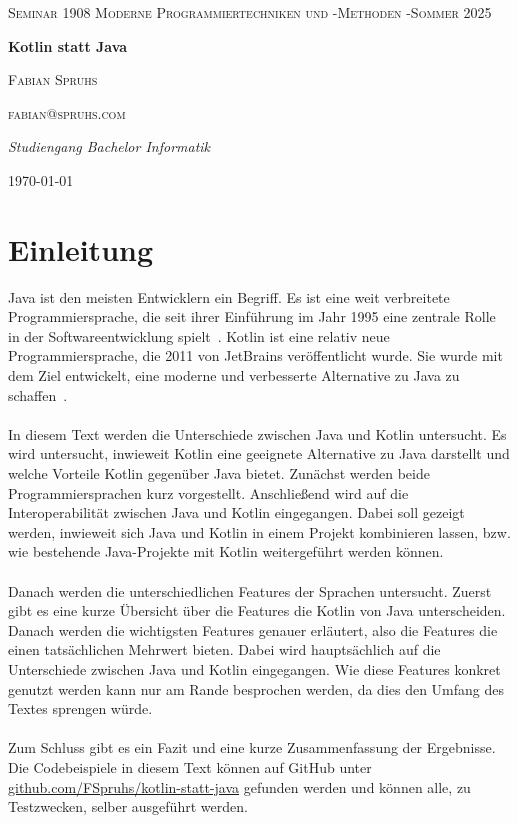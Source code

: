 \documentclass[11pt]{article}
\begin{document}
    \begin{titlepage}
        \centering
        {\scshape\LARGE Seminar 1908 Moderne Programmiertechniken und -Methoden -Sommer 2025 \par}
        \vspace{1cm}
        {\huge\bfseries Kotlin statt Java\par}
        \vspace{1.5cm}
        {\scshape\Large Fabian Spruhs\par}
        {\scshape fabian@spruhs.com\par}
        \vspace{2cm}
        {\Large\itshape Studiengang Bachelor Informatik\par}
        \vspace{2cm}


        {\large \today\par}
    \end{titlepage}

    \tableofcontents
    \newpage

    \section{Einleitung}
    Java ist den meisten Entwicklern ein Begriff.
    Es ist eine weit verbreitete Programmiersprache, die seit ihrer Einführung im Jahr 1995 eine zentrale Rolle in der Softwareentwicklung spielt~\cite[54]{insel}.
    Kotlin ist eine relativ neue Programmiersprache, die 2011 von JetBrains veröffentlicht wurde.
    Sie wurde mit dem Ziel entwickelt, eine moderne und verbesserte Alternative zu Java zu schaffen~\cite[19]{kotlin-handbuch}.\\
    \\
    In diesem Text werden die Unterschiede zwischen Java und Kotlin untersucht.
    Es wird untersucht, inwieweit Kotlin eine geeignete Alternative zu Java darstellt und welche Vorteile Kotlin gegenüber Java bietet.
    Zunächst werden beide Programmiersprachen kurz vorgestellt.
    Anschließend wird auf die Interoperabilität zwischen Java und Kotlin eingegangen.
    Dabei soll gezeigt werden, inwieweit sich Java und Kotlin in einem Projekt kombinieren lassen, bzw. wie bestehende Java-Projekte mit Kotlin weitergeführt werden können.\\
    \\
    Danach werden die unterschiedlichen Features der Sprachen untersucht.
    Zuerst gibt es eine kurze Übersicht über die Features die Kotlin von Java unterscheiden.
    Danach werden die wichtigsten Features genauer erläutert, also die Features die einen tatsächlichen Mehrwert bieten.
    Dabei wird hauptsächlich auf die Unterschiede zwischen Java und Kotlin eingegangen.
    Wie diese Features konkret genutzt werden kann nur am Rande besprochen werden, da dies den Umfang des Textes sprengen würde.\\
    \\
    Zum Schluss gibt es ein Fazit und eine kurze Zusammenfassung der Ergebnisse.
    Die Codebeispiele in diesem Text können auf GitHub unter \url{github.com/FSpruhs/kotlin-statt-java} gefunden werden und können alle, zu Testzwecken, selber ausgeführt werden.\\
    \\
\end{document}
